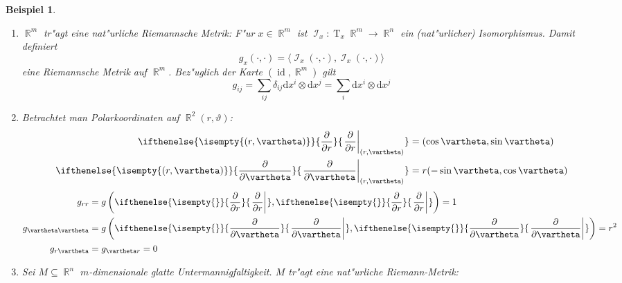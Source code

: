 \documentclass[paper=A4, twoside, chapterprefix=true, bibliography=totoc, headsepline]{scrbook}
\let\temp\phi{}
\let\phi\varphi{}
\let\varphi\temp{}
\let\temp\theta{}
\let\theta\vartheta{}
\let\vartheta\temp{}
\let\temp\epsilon{}
\let\epsilon\varepsilon{}
\let\varepsilon\temp{}
\let\temp\rho{}
\let\rho\varrho{}
\let\varrho\temp{}
\DeclareMathOperator{\R}{\mathbb{R}}
\DeclareMathOperator{\calI}{\mathcal{I}}
\DeclareMathOperator{\Id}{id}       %
\DeclareMathOperator{\T}{T}         %
\newcommand{\dop}{\mathrm{d}}
\newcommand{\pdifffrac}[3][]{\ifthenelse{\isempty{#1}}{\frac{\partial #2}{\partial #3}}{\left. \frac{\partial #2}{\partial #3} \right|_{#1}}}
\theoremstyle{plain}
\theoremstyle{nonumberplain}
\newtheorem{bsp}{Beispiel}
\theoremstyle{empty}
\theoremstyle{break}
\begin{document}
\begin{bsp}
  \begin{enumerate}[label=(\arabic*),leftmargin=*]
  \item $\R^m$ tr"agt eine nat"urliche Riemannsche Metrik: F"ur $x \in \R^m$ ist $\calI_x: \T_x\R^m \to \R^n$ ein (nat"urlicher) Isomorphismus.
    Damit definiert
    \[ g_x(\cdot,\cdot) = \langle \calI_x(\cdot,\cdot), \calI_x(\cdot,\cdot) \rangle \]
    eine Riemannsche Metrik auf $\R^m$. Bez"uglich der Karte $(\Id, \R^m)$ gilt
    \[ g_{ij} = \sum_{ij} \delta_{ij} \dop x^{i} \otimes \dop x^j = \sum_i \dop x^{i} \otimes \dop x^j \]
  \item Betrachtet man Polarkoordinaten auf $\R^2(r, \theta)$:
    \begin{align*}
      \pdifffrac[(r,\theta)]{}{r} &= (\cos \theta, \sin \theta)\\
      \pdifffrac[(r,\theta)]{}{\theta} &= r(-\sin \theta, \cos \theta)
    \end{align*}
    \begin{align*}
      g_{rr} &= g\left( \pdifffrac{}{r}, \pdifffrac{}{r} \right) = 1\\
      g_{\theta\theta} &= g\left( \pdifffrac{}{\theta}, \pdifffrac{}{\theta} \right) = r^2\\
      g_{r\theta} &= g_{\theta r} = 0
    \end{align*}
  \item Sei $M \subseteq \R^n$ $m$-dimensionale glatte Untermannigfaltigkeit. $M$ tr"agt eine nat"urliche Riemann-Metrik:
    \begin{center}
\end{center}
\end{enumerate}
\end{bsp}
\end{document}
